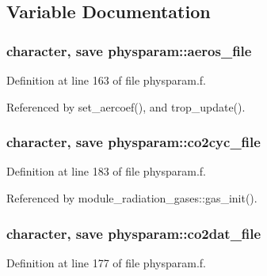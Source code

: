 \subsection{Variable Documentation}
\subsubsection[{\texorpdfstring{aeros\+\_\+file}{aeros_file}}]{\setlength{\rightskip}{0pt plus 5cm}character, save physparam\+::aeros\+\_\+file}\hypertarget{namespacephysparam_a21ceb784a896e6e88dc552786b1c4232}{}\label{namespacephysparam_a21ceb784a896e6e88dc552786b1c4232}


Definition at line 163 of file physparam.\+f.



Referenced by set\+\_\+aercoef(), and trop\+\_\+update().

\subsubsection[{\texorpdfstring{co2cyc\+\_\+file}{co2cyc_file}}]{\setlength{\rightskip}{0pt plus 5cm}character, save physparam\+::co2cyc\+\_\+file}\hypertarget{namespacephysparam_afe0dc3a936d79b4d7dd58fe29376cb1a}{}\label{namespacephysparam_afe0dc3a936d79b4d7dd58fe29376cb1a}


Definition at line 183 of file physparam.\+f.



Referenced by module\+\_\+radiation\+\_\+gases\+::gas\+\_\+init().

\subsubsection[{\texorpdfstring{co2dat\+\_\+file}{co2dat_file}}]{\setlength{\rightskip}{0pt plus 5cm}character, save physparam\+::co2dat\+\_\+file}\hypertarget{namespacephysparam_abed249e396bbc5c096408db58b5104c0}{}\label{namespacephysparam_abed249e396bbc5c096408db58b5104c0}


Definition at line 177 of file physparam.\+f.



